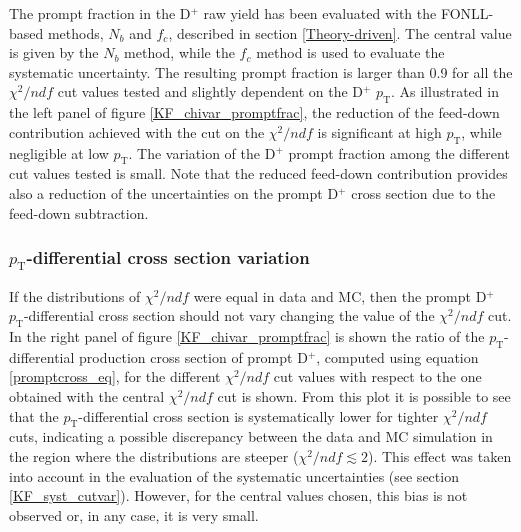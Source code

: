 \documentclass[b5paper,10pt,twoside,oldstyle,classica]{toptesi}
\newcommand{\pt}{p_\text{T}}
\begin{document}
The prompt fraction in the D$^+$ raw yield has been evaluated with the FONLL-based methods, $N_b$ and $f_c$, described in section \ref{Theory-driven}. The central value is given by the $N_b$ method, while the $f_c$ method is used to evaluate the systematic uncertainty. The resulting prompt fraction is larger than 0.9 for all the $\chi^2/ndf$ cut values tested and slightly dependent on the D$^+$ $\pt$. As illustrated in the left panel of figure \ref{KF_chivar_promptfrac}, the reduction of the feed-down contribution achieved with the cut on the $\chi^2/ndf$ is significant at high $\pt$, while negligible at low $\pt$. The variation of the D$^+$ prompt fraction among the different cut values tested is small. Note that the reduced feed-down contribution provides also a reduction of the uncertainties on the prompt D$^+$ cross section due to the feed-down subtraction.  
\subsubsection{$\pt$-differential cross section variation}
If the distributions of $\chi^2/ndf$ were equal in data and MC, then the prompt D$^+$ $\pt$-differential cross section should not vary changing the value of the $\chi^2/ndf$ cut. In the right panel of figure \ref{KF_chivar_promptfrac} is shown the ratio of the $\pt$-differential production cross section of prompt D$^+$, computed using equation \ref{promptcross_eq}, for the different $\chi^2/ndf$ cut values with respect to the one obtained with the central $\chi^2/ndf$ cut is shown. From this plot it is possible to see that the $\pt$-differential cross section is systematically lower for tighter $\chi^2/ndf$ cuts, indicating a possible discrepancy between the data and MC simulation in the region where the distributions are steeper ($\chi^2/ndf \lesssim 2$). This effect was taken into account in the evaluation of the systematic uncertainties (see section \ref{KF_syst_cutvar}). However, for the central values chosen, this bias is not observed or, in any case, it is very small.    
\label{KF_chi_crossvar_sec}
\end{document}
